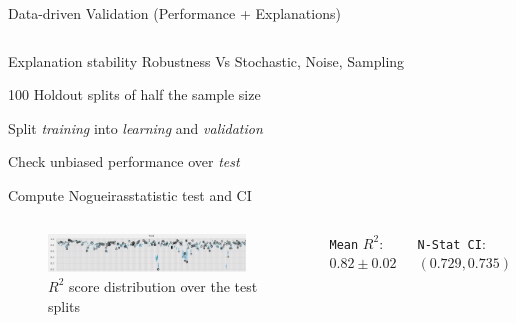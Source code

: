 \documentclass[compress,ignorenonframetext,aspectratio=1610]{beamer}
\begin{document}
\begin{frame}{Data-driven Validation (Performance + Explanations)}
	\begin{columns}
		
		
			\begin{block}{Explanation stability}
				Robustness Vs Stochastic, Noise, Sampling
				
				100 Holdout splits of half the sample size
				
				Split \textit{training} into \textit{learning} and \textit{validation}
				
				Check unbiased performance over \textit{test}
				
				Compute Nogueiras\footnotemark statistic test and CI
				
			\end{block}

		
	\end{columns}

	\pause
	
	\vspace{1em}%
	
	\begin{columns}
		\column{0.67\textwidth}
		\begin{figure}
			\centering
			\includegraphics[width=0.9\textwidth]{figs/methods/cv_performance_distribution.pdf}
			\caption{$R^2$ score distribution over the test splits}
		\end{figure}
	
		\column{0.33\textwidth}
		\texttt{Mean} $R^2$: $0.82 \pm 0.02$
		
		\texttt{N-Stat CI}: $(0.729, 0.735)$
		
	\end{columns}
	

\end{frame}
\end{document}
